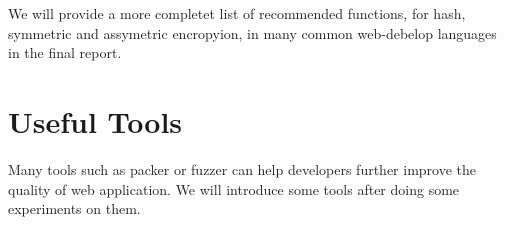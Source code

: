 \documentclass[conference]{IEEEtran}
\begin{document}
We will provide a more completet list of recommended functions,
for hash, symmetric and assymetric encropyion,
in many common web-debelop languages
in the final report.

%
%
%
%


%   
\section{Useful Tools}
Many tools such as packer or fuzzer can help developers
further improve the quality of web application.
We will introduce some tools after doing some experiments on them.





\end{document}
